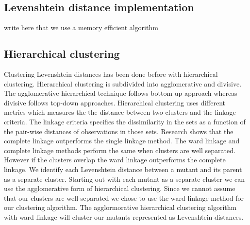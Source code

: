 \documentclass[../main]{subfiles}
\begin{document}
\subsection{Levenshtein distance implementation}
write here that we use a memory efficient algorithm


\subsection{Hierarchical clustering}
Clustering Levenshtein distances has been done before with hierarchical clustering\cite{Rajalingam2011HierarchicalStudy, Gothai2010PerformanceAlgorithms}. 
Hierarchical clustering is subdivided into agglomerative and divisive. 
The agglomerative hierarchical technique follows bottom up approach whereas divisive follows top-down approaches.
Hierarchical clustering uses different metrics which measures the the distance between two clusters and the linkage criteria\cite{Rajalingam2011HierarchicalStudy}. 
The linkage criteria specifies the dissimilarity in the sets as a function of the pair-wise distances of observations in those sets\cite{Rajalingam2011HierarchicalStudy}.
\newline
Research shows that the complete linkage outperforms the single linkage method\cite{Vijaya2019ComparativeClustering}.
The ward linkage and complete linkage methods perform the same when clusters are well separated\cite{Vijaya2019ComparativeClustering}.
However if the clusters overlap the ward linkage outperforms the complete linkage\cite{Vijaya2019ComparativeClustering}.
\newline
We identify each Levenshtein distance between a mutant and its parent as a separate cluster.
Starting out with each mutant as a separate cluster we can use the agglomerative form of hierarchical clustering.
Since we cannot assume that our clusters are well separated we chose to use the ward linkage method for our clustering algorithm.
The agglormorative hierarchical clustering algorithm with ward linkage will cluster our mutants represented as Levenshtein distances.
\end{document}
